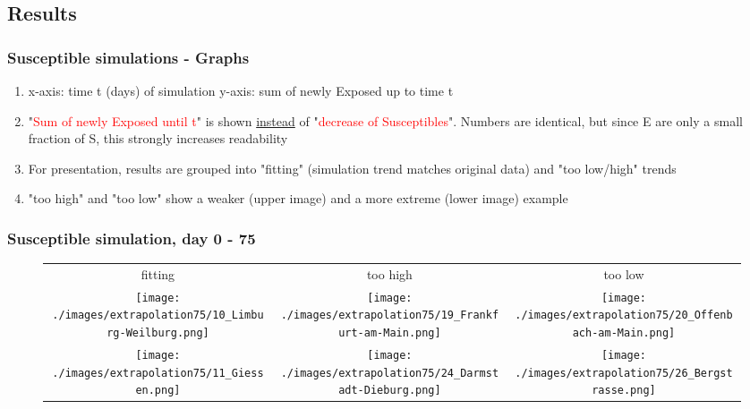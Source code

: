 \documentclass{beamer}
\begin{document}
\subsection{Results}
\begin{frame}
	\frametitle{Susceptible simulations - Graphs}
	\begin{enumerate}[$\bullet$]
		\item x-axis: time t (days) of simulation \newline
			y-axis: sum of newly Exposed up to time t
		\item "\textcolor{red}{Sum of newly Exposed until t}" is shown \underline{instead} of "\textcolor{red}{decrease of Susceptibles}". Numbers are identical,
			but since E are only a small fraction of S, this strongly increases readability
		\item For presentation, results are grouped into "fitting" (simulation trend matches original data) and "too low/high" trends
		\item "too high" and "too low" show a weaker (upper image) and a more extreme (lower image) example
	\end{enumerate}
\end{frame}

\begin{frame}
	\frametitle{Susceptible simulation, day 0 - 75}
	\begin{center}
		\begin{figure}
			\begin{adjustwidth}{-0.8cm}{}
			\begin{tabular}{c|c|c}
				fitting & too high & too low \\
				\texttt{[image: ./images/extrapolation75/10\_Limburg-Weilburg.png]}
					& \texttt{[image: ./images/extrapolation75/19\_Frankfurt-am-Main.png]}
					& \texttt{[image: ./images/extrapolation75/20\_Offenbach-am-Main.png]} \\
				\texttt{[image: ./images/extrapolation75/11\_Giessen.png]}
					& \texttt{[image: ./images/extrapolation75/24\_Darmstadt-Dieburg.png]}
					& \texttt{[image: ./images/extrapolation75/26\_Bergstrasse.png]}
			\end{tabular}
			\end{adjustwidth}
		\end{figure}
	\end{center}
\end{frame}
\end{document}
